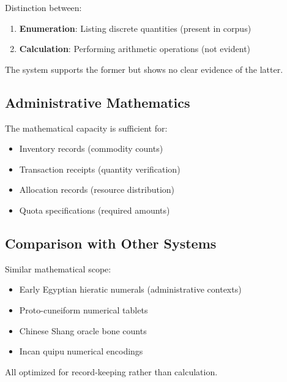 Distinction between:
\begin{enumerate}
    \item \textbf{Enumeration}: Listing discrete quantities (present in corpus)
    \item \textbf{Calculation}: Performing arithmetic operations (not evident)
\end{enumerate}

The system supports the former but shows no clear evidence of the latter.

\subsection{Administrative Mathematics}

The mathematical capacity is sufficient for:
\begin{itemize}
    \item Inventory records (commodity counts)
    \item Transaction receipts (quantity verification)
    \item Allocation records (resource distribution)
    \item Quota specifications (required amounts)
\end{itemize}

\subsection{Comparison with Other Systems}

Similar mathematical scope:
\begin{itemize}
    \item Early Egyptian hieratic numerals (administrative contexts)
    \item Proto-cuneiform numerical tablets
    \item Chinese Shang oracle bone counts
    \item Incan quipu numerical encodings
\end{itemize}

All optimized for record-keeping rather than calculation.
